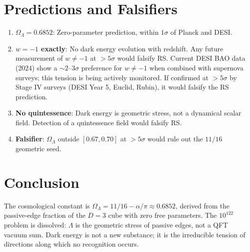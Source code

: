 \documentclass[12pt,a4paper]{article}
\theoremstyle{definition}
\theoremstyle{remark}
\begin{document}
\section{Predictions and Falsifiers}
\label{sec:predictions}

\begin{enumerate}
  \item \textbf{$\Omega_\Lambda = 0.6852$}: Zero-parameter
  prediction, within $1\sigma$ of Planck and DESI.

  \item \textbf{$w = -1$ exactly}: No dark energy evolution with
  redshift.  Any future measurement of $w \neq -1$ at $> 5\sigma$
  would falsify RS.  Current DESI BAO data (2024) show a $\sim
  2$--$3\sigma$ preference for $w \neq -1$ when combined with
  supernova surveys; this tension is being actively monitored.
  If confirmed at $>5\sigma$ by Stage IV surveys (DESI Year 5,
  Euclid, Rubin), it would falsify the RS prediction.

  \item \textbf{No quintessence}: Dark energy is geometric
  stress, not a dynamical scalar field.  Detection of a
  quintessence field would falsify RS.

  \item \textbf{Falsifier}: $\Omega_\Lambda$ outside
  $[0.67, 0.70]$ at $> 5\sigma$ would rule out the $11/16$
  geometric seed.
\end{enumerate}

\section{Conclusion}
\label{sec:conclusion}

The cosmological constant is $\Omega_\Lambda = 11/16 -
\alpha/\pi \approx 0.6852$, derived from the passive-edge
fraction of the $D = 3$ cube with zero free parameters.  The
$10^{122}$ problem is dissolved: $\Lambda$ is the geometric
stress of passive edges, not a QFT vacuum sum.  Dark energy is
not a new substance; it is the irreducible tension of directions
along which no recognition occurs.
\end{document}
